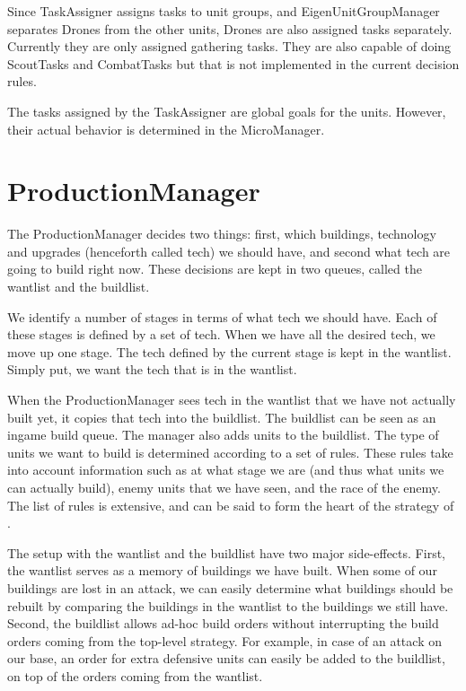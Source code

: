 Since TaskAssigner assigns tasks to unit groups, and EigenUnitGroupManager separates Drones from the other units, Drones are also assigned tasks separately. Currently they are only assigned gathering tasks. They are also capable of doing ScoutTasks and CombatTasks but that is not implemented in the current decision rules.

The tasks assigned by the TaskAssigner are global goals for the units. However, their actual behavior is determined in the MicroManager.

\section{ProductionManager}

The ProductionManager decides two things: first, which buildings, technology and upgrades (henceforth called tech) we should have, and second what tech are going to build right now. These decisions are kept in two queues, called the wantlist and the buildlist.

We identify a number of stages in terms of what tech we should have. Each of these stages is defined by a set of tech. When we have all the desired tech, we move up one stage. The tech defined by the current stage is kept in the wantlist. Simply put, we want the tech that is in the wantlist.

When the ProductionManager sees tech in the wantlist that we have not actually built yet, it copies that tech into the buildlist. The buildlist can be seen as an ingame build queue. The manager also adds units to the buildlist. The type of units we want to build is determined according to a set of rules. These rules take into account information such as at what stage we are (and thus what units we can actually build), enemy units that we have seen, and the race of the enemy. The list of rules is extensive, and can be said to form the heart of the strategy of \massexpand{}.

The setup with the wantlist and the buildlist have two major side-effects. First, the wantlist serves as a memory of buildings we have built. When some of our buildings are lost in an attack, we can easily determine what buildings should be rebuilt by comparing the buildings in the wantlist to the buildings we still have. Second, the buildlist allows ad-hoc build orders without interrupting the build orders coming from the top-level strategy. For example, in case of an attack on our base, an order for extra defensive units can easily be added to the buildlist, on top of the orders coming from the wantlist.

